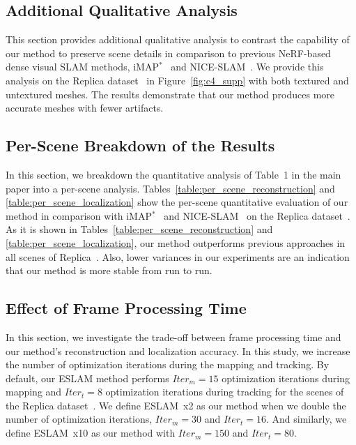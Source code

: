 \subsection{Additional Qualitative Analysis} \label{sec:c4_supp_additional}

This section provides additional qualitative analysis to contrast the capability of our method to preserve scene details in comparison to previous NeRF-based dense visual SLAM methods, iMAP$^*$~\cite{sucar2021imap} and NICE-SLAM~\cite{zhu2022nice}. We provide this analysis on the Replica dataset~\cite{replica19arxiv} in Figure~\ref{fig:c4_supp} with both textured and untextured meshes. The results demonstrate that our method produces more accurate meshes with fewer artifacts.

\subsection{Per-Scene Breakdown of the Results} \label{sec:c4_supp_per_scene}

In this section, we breakdown the quantitative analysis of Table~1 in the main paper into a per-scene analysis. Tables~\ref{table:per_scene_reconstruction} and \ref{table:per_scene_localization} show the per-scene quantitative evaluation of our method in comparison with iMAP$^*$~\cite{sucar2021imap} and NICE-SLAM~\cite{zhu2022nice} on the Replica dataset~\cite{replica19arxiv}. As it is shown in Tables~\ref{table:per_scene_reconstruction} and \ref{table:per_scene_localization}, our method outperforms previous approaches in all scenes of Replica~\cite{replica19arxiv}. Also, lower variances in our experiments are an indication that our method is more stable from run to run.

\subsection{Effect of Frame Processing Time} \label{sec:c4_iters}

In this section, we investigate the trade-off between frame processing time and our method's reconstruction and localization accuracy. In this study, we increase the number of optimization iterations during the mapping and tracking. By default, our ESLAM method performs $Iter_{m}=15$ optimization iterations during mapping and $Iter_{t}=8$ optimization iterations during tracking for the scenes of the Replica dataset~\cite{replica19arxiv}. We define ESLAM~x2 as our method when we double the number of optimization iterations, \ie $Iter_{m}=30$ and $Iter_{t}=16$. And similarly, we define ESLAM~x10 as our method with $Iter_{m}=150$ and $Iter_{t}=80$.

